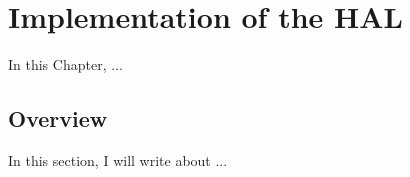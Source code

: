 \chapter{Implementation of the HAL}
\label{ch.development}

In this Chapter, ...

\section{Overview}
    In this section, I will write about ...
